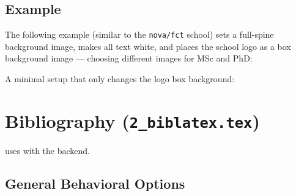 \subsection{Example}
\label{sub:spine_example}

The following example (similar to the \texttt{nova/fct} school) sets a
full-spine background image, makes all text white, and places the school
logo as a box background image — choosing different images for MSc and PhD:

\begin{latexcode}
\end{latexcode}

A minimal setup that only changes the logo box background:
\begin{latexcode}
\end{latexcode}


\section{Bibliography (\texttt{2\_biblatex.tex})}
\label{sec:bibliography}

\novathesis{} uses  with the  backend.

\subsection{General Behavioral Options}
\label{sub:bib_general}

\begin{latexcode}
\end{latexcode}


